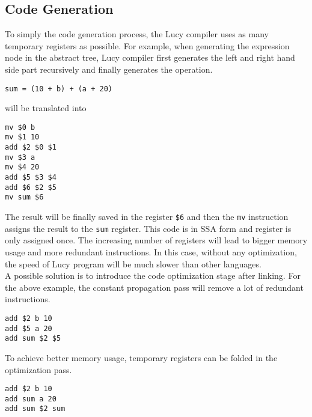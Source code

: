 \subsection{Code Generation}
To simply the code generation process, the Lucy compiler uses as many temporary registers as possible. For example, when generating the expression node in the abstract tree, Lucy compiler first generates the left and right hand side part recursively and finally generates the operation.
\begin{lstlisting}
sum = (10 + b) + (a + 20)
\end{lstlisting}
will be translated into
\begin{lstlisting}[language=LucyX]
mv $0 b
mv $1 10
add $2 $0 $1
mv $3 a
mv $4 20
add $5 $3 $4
add $6 $2 $5
mv sum $6
\end{lstlisting}
The result will be finally saved in the register \texttt{\$6} and then the \texttt{mv} instruction assigns the result to the \texttt{sum} register. This code is in SSA form and register is only assigned once. The increasing number of registers will lead to bigger memory usage and more redundant instructions. In this case, without any optimization, the speed of Lucy program will be much slower than other languages. \\
A possible solution is to introduce the code optimization stage after linking. For the above example, the constant propagation pass will remove a lot of redundant instructions.
\begin{lstlisting}[language=LucyX]
add $2 b 10
add $5 a 20
add sum $2 $5
\end{lstlisting}
To achieve better memory usage, temporary registers can be folded in the optimization pass.
\begin{lstlisting}[language=LucyX]
add $2 b 10
add sum a 20
add sum $2 sum
\end{lstlisting}

